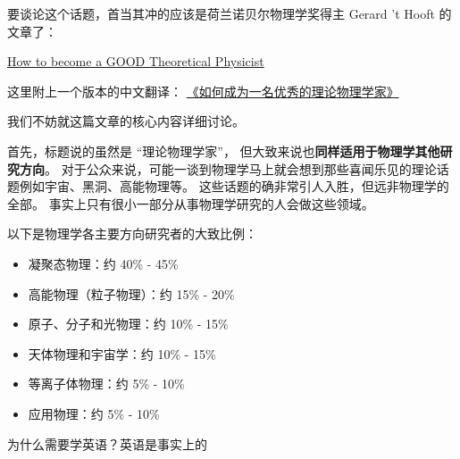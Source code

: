 
要谈论这个话题，首当其冲的应该是荷兰诺贝尔物理学奖得主 Gerard 't Hooft 的文章了：

\href{https://webspace.science.uu.nl/~hooft101/theorist.html}{How to become a GOOD Theoretical Physicist}

这里附上一个版本的中文翻译： \href{https://xialab.pku.edu.cn/kytdyw1/zdylm.m.jsp?wbtreeid=1011&tstreeid=11956&_t_uid=2945&language=en&homepageuuid=BF649325C5584FC683CE0B601D21AC65&templateuuid=4CC182410BA14FF8B55ED726FB2087FB&producttype=0&_tmode_=99&tsitesapptype=zdylm}{《如何成为一名优秀的理论物理学家》}

我们不妨就这篇文章的核心内容详细讨论。

首先，标题说的虽然是 “理论物理学家”， 但大致来说也\textbf{同样适用于物理学其他研究方向}。 对于公众来说，可能一谈到物理学马上就会想到那些喜闻乐见的理论话题例如宇宙、黑洞、高能物理等。 这些话题的确非常引人入胜，但远非物理学的全部。 事实上只有很小一部分从事物理学研究的人会做这些领域。 

以下是物理学各主要方向研究者的大致比例：
\begin{itemize}
\item 凝聚态物理：约 40\% - 45\%
\item 高能物理（粒子物理）：约 15\% - 20\%
\item 原子、分子和光物理：约 10\% - 15\%
\item 天体物理和宇宙学：约 10\% - 15\%
\item 等离子体物理：约 5\% - 10\%
\item 应用物理：约 5\% - 10\%
\end{itemize}

为什么需要学英语？英语是事实上的
